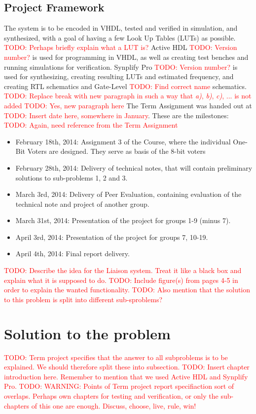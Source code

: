 \documentclass[a4paper]{IEEEtran}
\newcommand\TODO[1]{\textcolor{red}{TODO:#1}}
\newcommand\todo[1]{\TODO{#1}}
\begin{document}
\subsection{Project Framework}
The system is to be encoded in VHDL, tested and verified in simulation, and synthesized, with a goal of having a few Look Up Tables (LUTs) as possible. \todo{ Perhaps briefly explain what a LUT is?}
Active HDL \todo{ Version number?} is used for programming in VHDL, as well as creating test benches and running simulations for verification. Synplify Pro \todo{ Version number?} is used for synthesizing, creating resulting LUTs and estimated frequency, and creating RTL schematics and Gate-Level \todo{ Find correct name} schematics. 
\break 
\todo{ Replace break with new paragraph in such a way that \textit{a)}, \textit{b)}, \textit{c)}, ... is not added}
\break
\todo{ Yes, new paragraph here} The Term Assignment was handed out at \todo{ Insert date here, somewhere in January}. These are the milestones: \todo{ Again, need reference from the Term Assignment}
\begin{itemize}
    \item February 18th, 2014: Assignment 3 of the Course, where the individual One-Bit Voters are designed. They serve as basis of the 8-bit voters
    \item February 28th, 2014: Delivery of technical notes, that will contain preliminary solutions to sub-problems 1, 2 and 3.
    \item March 3rd, 2014: Delivery of Peer Evaluation, containing evaluation of the technical note and project of another group.
    \item March 31st, 2014: Presentation of the project for groups 1-9 (minus 7).
    \item April 3rd, 2014: Presentation of the project for groups 7, 10-19.
    \item April 4th, 2014: Final report delivery.
\end{itemize}

\break
\break
\todo{ Describe the idea for the Liaison system. Treat it like a black box and explain what it is supposed to do.}
\break
\break
\todo{ Include figure(s) from pages 4-5 in order to explain the wanted functionality. }
\break
\break
\todo{ Also mention that the solution to this problem is split into different sub-sproblems? }

\section{ Solution to the problem}
\todo{ Term project specifies that the answer to all subproblems is to be explained. We should therefore split these into subsection. }
\break
\break
\todo{ Insert chapter introduction here. Remember to mention that we used Active HDL and Synplify Pro.}
\break
\break
\todo{ WARNING: Points of Term project report specifiaction sort of overlaps. Perhaps own chapters for testing and verification, or only the sub-chapters of this one are enough. Discuss, choose, live, rule, win!} 
\end{document}
